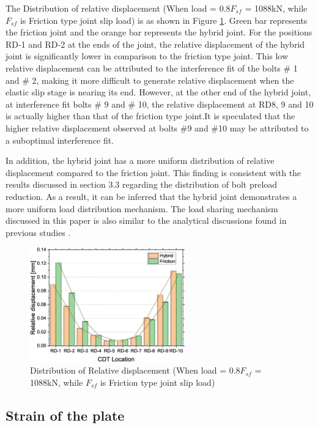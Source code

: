 The Distribution of relative displacement (When load = 0.8$F_{sf}$ = 1088kN, while $F_{sf}$ is Friction type joint slip load) is as shown in Figure \ref{fig-rdbar}. Green bar represents the friction joint and the orange bar represents the hybrid joint. For the positions RD-1 and RD-2 at the ends of the joint, the relative displacement of the hybrid joint is significantly lower in comparison to the friction type joint. This low relative displacement can be attributed to the interference fit of the bolts \# 1 and \# 2, making it more difficult to generate relative displacement when the elastic slip stage is nearing its end. However, at the other end of the hybrid joint, at interference fit bolts \# 9 and \# 10, the relative displacement at RD8, 9 and 10 is actually higher than that of the friction type joint.It is speculated that the higher relative displacement observed at bolts \#9 and \#10 may be attributed to a suboptimal interference fit.

In addition, the hybrid joint has a more uniform distribution of relative displacement compared to the friction joint. This finding is consistent with the results discussed in section 3.3 regarding the distribution of bolt preload reduction. As a result, it can be inferred that the hybrid joint demonstrates a more uniform load distribution mechanism. The load sharing mechanism discussed in this paper is also similar to the analytical discussions found in previous studies \cite{Chen2023MechanicalConnections}.

\begin{figure}
    \centering
    \includegraphics[width=0.6\textwidth]{imgs/ch6/RD-bar.eps}
    \caption{Distribution of Relative displacement (When load = 0.8$F_{sf}$ = 1088kN, while $F_{sf}$ is Friction type joint slip load) }
    \label{fig-rdbar}
\end{figure}

\subsection{Strain of the plate}

